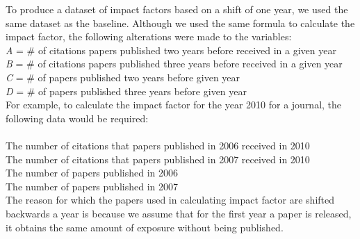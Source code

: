 \documentclass[jair,twoside,11pt,theapa]{article}
\begin{document}
To produce a dataset of impact factors based on a shift of one year, we used the same dataset as the baseline. Although we used the same formula to calculate the impact factor, the following alterations were made to the variables: \\

\noindent
\textit{A} = \# of citations papers published two years before received in a given year
\\ \textit{B} = \# of citations papers published three years before received in a given year
\\ \textit{C} = \# of papers published two years before given year 
\\ \textit{D} = \# of papers published three years before given year \\

For example, to calculate the impact factor for the year 2010 for a journal, the following data would be required:\\ \\ 
The number of citations that papers published in 2006 received in 2010 
\\The number of citations that papers published in 2007 received in 2010 
\\The number of papers published in 2006
\\The number of papers published in 2007 \\

The reason for which the papers used in calculating impact factor are shifted backwards a year is because we assume that for the first year a paper is released, it obtains the same amount of exposure without being published. 
\end{document}
